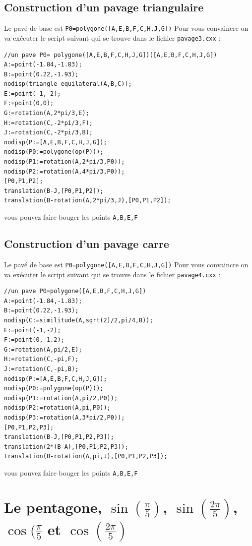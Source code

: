 \documentclass[a4paper,11pt]{book}
\begin{document}
\subsection{Construction d'un pavage triangulaire}
Le pav\'e de base est {\tt P0=polygone([A,E,B,F,C,H,J,G])}
Pour vous convaincre on va ex\'ecuter le script suivant qui se trouve dans
le fichier {\tt pavage3.cxx} :
\begin{verbatim}
//un pave P0= polygone([A,E,B,F,C,H,J,G])([A,E,B,F,C,H,J,G])
A:=point(-1.84,-1.83);
B:=point(0.22,-1.93);
nodisp(triangle_equilateral(A,B,C));
E:=point(-1,-2);
F:=point(0,0);
G:=rotation(A,2*pi/3,E);
H:=rotation(C,-2*pi/3,F);
J:=rotation(C,-2*pi/3,B);
nodisp(P:=[A,E,B,F,C,H,J,G]);
nodisp(P0:=polygone(op(P)));
nodisp(P1:=rotation(A,2*pi/3,P0));
nodisp(P2:=rotation(A,4*pi/3,P0));
[P0,P1,P2];
translation(B-J,[P0,P1,P2]);
translation(B-rotation(A,2*pi/3,J),[P0,P1,P2]);
\end{verbatim}
vous pouvez faire bouger les points {\tt A,B,E,F}
\subsection{Construction d'un pavage carre}
Le pav\'e de base est {\tt P0=polygone([A,E,B,F,C,H,J,G])}
Pour vous convaincre on va ex\'ecuter le script suivant qui se trouve dans
le fichier {\tt pavage4.cxx} :
\begin{verbatim}
//un pave P0=polygone([A,E,B,F,C,H,J,G])
A:=point(-1.84,-1.83);
B:=point(0.22,-1.93);
nodisp(C:=similitude(A,sqrt(2)/2,pi/4,B));
E:=point(-1,-2);
F:=point(0,-1.2);
G:=rotation(A,pi/2,E);
H:=rotation(C,-pi,F);
J:=rotation(C,-pi,B);
nodisp(P:=[A,E,B,F,C,H,J,G]);
nodisp(P0:=polygone(op(P)));
nodisp(P1:=rotation(A,pi/2,P0));
nodisp(P2:=rotation(A,pi,P0));
nodisp(P3:=rotation(A,3*pi/2,P0));
[P0,P1,P2,P3];
translation(B-J,[P0,P1,P2,P3]);
translation(2*(B-A),[P0,P1,P2,P3]);
translation(B-rotation(A,pi,J),[P0,P1,P2,P3]);
\end{verbatim}
vous pouvez faire bouger les points {\tt A,B,E,F}

\section{Le pentagone, $\sin(\frac{\pi}{5})$, $\sin(\frac{2\pi}{5})$, $\cos(\frac{\pi}{5}$ et $\cos(\frac{2\pi}{5})$}
\end{document}
